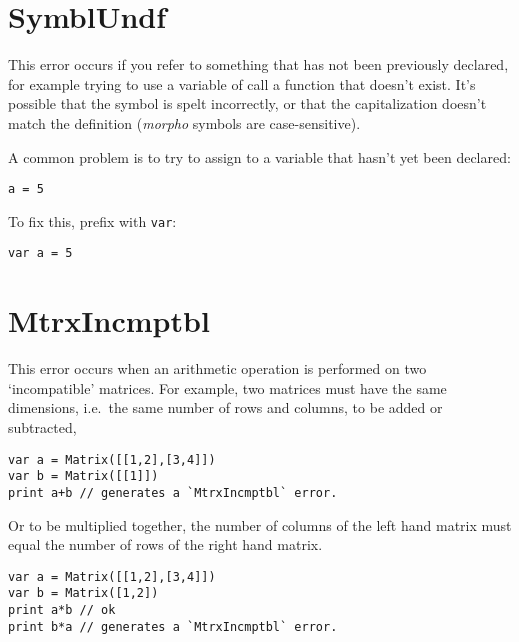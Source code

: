 \hypertarget{symblundf}{%
\section{SymblUndf}\label{symblundf}}

This error occurs if you refer to something that has not been previously
declared, for example trying to use a variable of call a function that
doesn't exist. It's possible that the symbol is spelt incorrectly, or
that the capitalization doesn't match the definition (\emph{morpho}
symbols are case-sensitive).

A common problem is to try to assign to a variable that hasn't yet been
declared:

\begin{lstlisting}
a = 5
\end{lstlisting}

To fix this, prefix with \texttt{var}:

\begin{lstlisting}
var a = 5
\end{lstlisting}

\hypertarget{mtrxincmptbl}{%
\section{MtrxIncmptbl}\label{mtrxincmptbl}}

This error occurs when an arithmetic operation is performed on two
`incompatible' matrices. For example, two matrices must have the same
dimensions, i.e.~the same number of rows and columns, to be added or
subtracted,

\begin{lstlisting}
var a = Matrix([[1,2],[3,4]])
var b = Matrix([[1]])
print a+b // generates a `MtrxIncmptbl` error.
\end{lstlisting}

Or to be multiplied together, the number of columns of the left hand
matrix must equal the number of rows of the right hand matrix.

\begin{lstlisting}
var a = Matrix([[1,2],[3,4]])
var b = Matrix([1,2])
print a*b // ok
print b*a // generates a `MtrxIncmptbl` error.
\end{lstlisting}
